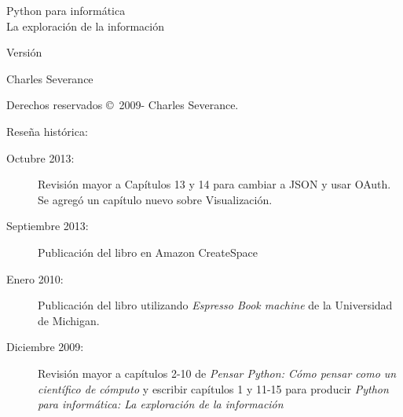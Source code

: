 



\newtheorem{ex}{Exercise}[chapter]

\begin{latexonly}

\renewcommand{\blankpage}{\thispagestyle{empty} \quad \newpage}

\thispagestyle{empty}

\begin{flushright}
\vspace*{2.0in}

\begin{spacing}{3}
{\huge Python para inform\'atica}\\
{\Large La exploraci\'on de la informaci\'on}
\end{spacing}

\vspace{0.25in}

Versi\'on \theversion

\vspace{0.5in}


{\Large
Charles Severance\\
}

\vfill

\end{flushright}

\pagebreak
\thispagestyle{empty}

{\small
Derechos reservados \copyright ~2009- Charles Severance.


Rese\~na hist\'orica:

\begin{description}

\item[Octubre 2013:] Revisi\'on mayor a Cap\'itulos 13 y 14
para cambiar a JSON y usar OAuth.
Se agreg\'o un cap\'itulo nuevo sobre Visualizaci\'on.

\item[Septiembre 2013:] Publicaci\'on del libro en Amazon CreateSpace

\item[Enero 2010:] Publicaci\'on del libro utilizando \textit{Espresso Book machine} de la Universidad de Michigan.

\item[Diciembre 2009:] Revisi\'on mayor a cap\'itulos 2-10 de
\emph{Pensar Python: C\'omo pensar como un cient\'ifico de c\'omputo}
y escribir cap\'itulos 1 y 11-15 para producir 
\emph{Python para inform\'atica: La exploraci\'on de la informaci\'on}


\end{description}}
\end{latexonly}
